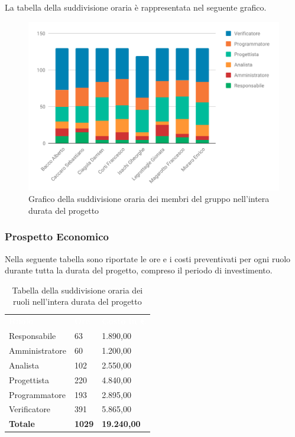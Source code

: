 La tabella della suddivisione oraria è rappresentata nel seguente grafico.
\begin{figure}[H]
\centering
	\includegraphics[width=.9\linewidth]{Preventivo/grafici/TI1_1.pdf}
	\caption{Grafico della suddivisione oraria dei membri del gruppo nell'intera durata del progetto}
\end{figure}

\subsubsection{Prospetto Economico}
Nella seguente tabella sono riportate le ore e i costi preventivati per ogni ruolo durante tutta la durata del progetto, compreso il periodo di investimento.


\begin{table}[H]	
	\begin{center}
	    \begin{tabular}{C{4cm}C{1cm}C{3,5cm}}
			\textcolor{white}{\textbf{Ruolo}} & \textcolor{white}{\textbf{Ore}} & \textcolor{white}{\textbf{Costo in €}}
			\\
			Responsabile & 63 & 1.890,00 \\
			Amministratore & 60 & 1.200,00 \\
			Analista & 102 & 2.550,00 \\
			Progettista & 220 & 4.840,00 \\
			Programmatore & 193 & 2.895,00 \\
			Verificatore & 391 & 5.865,00 \\
			\textbf{Totale} & \textbf{1029} & \textbf{19.240,00} \\
		\end{tabular}
	    \caption{Tabella della suddivisione oraria dei ruoli nell'intera durata del progetto} \label{tab:tabellaRuoliProgInt} 
	\end{center}
\end{table}


